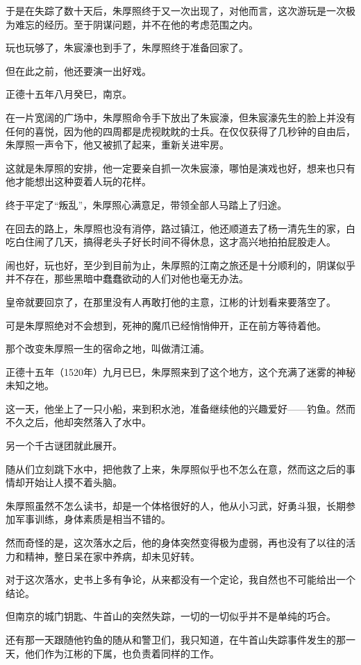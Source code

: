 \begin{multicols}{\theparacolNo}
于是在失踪了数十天后，朱厚照终于又一次出现了，对他而言，这次游玩是一次极为难忘的经历。至于阴谋问题，并不在他的考虑范围之内。

玩也玩够了，朱宸濠也到手了，朱厚照终于准备回家了。

但在此之前，他还要演一出好戏。

正德十五年八月癸巳，南京。

在一片宽阔的广场中，朱厚照命令手下放出了朱宸濠，但朱宸濠先生的脸上并没有任何的喜悦，因为他的四周都是虎视眈眈的士兵。在仅仅获得了几秒钟的自由后，朱厚照一声令下，他又被抓了起来，重新关进牢房。

这就是朱厚照的安排，他一定要亲自抓一次朱宸濠，哪怕是演戏也好，想来也只有他才能想出这种耍着人玩的花样。

终于平定了“叛乱”，朱厚照心满意足，带领全部人马踏上了归途。

在回去的路上，朱厚照也没有消停，路过镇江，他还顺道去了杨一清先生的家，白吃白住闹了几天，搞得老头子好长时间不得休息，这才高兴地拍拍屁股走人。

闹也好，玩也好，至少到目前为止，朱厚照的江南之旅还是十分顺利的，阴谋似乎并不存在，那些黑暗中蠢蠢欲动的人们对他也毫无办法。

皇帝就要回京了，在那里没有人再敢打他的主意，江彬的计划看来要落空了。

可是朱厚照绝对不会想到，死神的魔爪已经悄悄伸开，正在前方等待着他。

那个改变朱厚照一生的宿命之地，叫做清江浦。

正德十五年（1520年）九月已巳，朱厚照来到了这个地方，这个充满了迷雾的神秘未知之地。

这一天，他坐上了一只小船，来到积水池，准备继续他的兴趣爱好——钓鱼。然而不久之后，他却突然落入了水中。

另一个千古谜团就此展开。

随从们立刻跳下水中，把他救了上来，朱厚照似乎也不怎么在意，然而这之后的事情却开始让人摸不着头脑。

朱厚照虽然不怎么读书，却是一个体格很好的人，他从小习武，好勇斗狠，长期参加军事训练，身体素质是相当不错的。

然而奇怪的是，这次落水之后，他的身体突然变得极为虚弱，再也没有了以往的活力和精神，整日呆在家中养病，却未见好转。

对于这次落水，史书上多有争论，从来都没有一个定论，我自然也不可能给出一个结论。

但南京的城门钥匙、牛首山的突然失踪，一切的一切似乎并不是单纯的巧合。

还有那一天跟随他钓鱼的随从和警卫们，我只知道，在牛首山失踪事件发生的那一天，他们作为江彬的下属，也负责着同样的工作。


\end{multicols}
